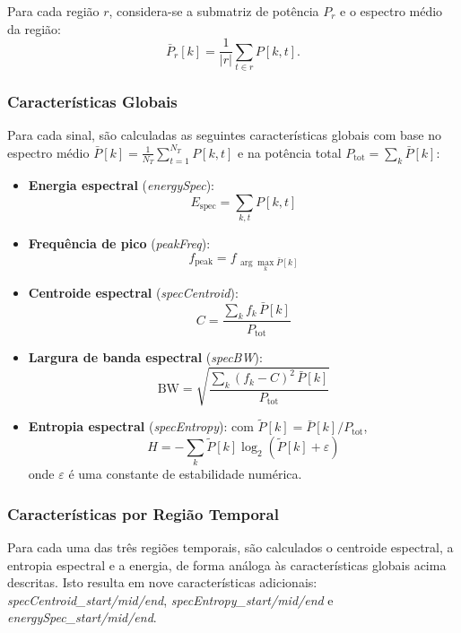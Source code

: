 \documentclass[12pt]{article}
\begin{document}
Para cada região $r$, considera-se a submatriz de potência $P_r$ e o espectro médio da região:
\[
\bar{P}_r[k] = \frac{1}{|r|} \sum_{t \in r} P[k, t].
\]

\subsubsection{Características Globais}

Para cada sinal, são calculadas as seguintes características globais com base no espectro médio
$\bar{P}[k] = \frac{1}{N_T}\sum_{t=1}^{N_T} P[k,t]$ e na potência total
$P_{\text{tot}} = \sum_k \bar{P}[k]$:

\begin{itemize}
    \item \textbf{Energia espectral} (\textit{energySpec}):
    \[
    E_{\text{spec}} = \sum_{k,t} P[k,t]
    \]

    \item \textbf{Frequência de pico} (\textit{peakFreq}):
    \[
    f_{\text{peak}} = f_{\,\arg\max_k \bar{P}[k]}
    \]

    \item \textbf{Centroide espectral} (\textit{specCentroid}):
    \[
    C = \frac{\sum_k f_k\, \bar{P}[k]}{P_{\text{tot}}}
    \]

    \item \textbf{Largura de banda espectral} (\textit{specBW}):
    \[
    \text{BW} = \sqrt{\frac{\sum_k (f_k - C)^2\, \bar{P}[k]}{P_{\text{tot}}}}
    \]

    \item \textbf{Entropia espectral} (\textit{specEntropy}): com $\tilde{P}[k] = \bar{P}[k] / P_{\text{tot}}$,
    \[
    H = -\sum_k \tilde{P}[k] \log_2\!\left(\tilde{P}[k] + \varepsilon\right)
    \]
    onde $\varepsilon$ é uma constante de estabilidade numérica.
\end{itemize}

\subsubsection{Características por Região Temporal}

Para cada uma das três regiões temporais, são calculados o centroide espectral, a entropia
espectral e a energia, de forma análoga às características globais acima descritas. Isto resulta
em nove características adicionais:
\textit{specCentroid\_start/mid/end},
\textit{specEntropy\_start/mid/end} e
\textit{energySpec\_start/mid/end}.
\end{document}
